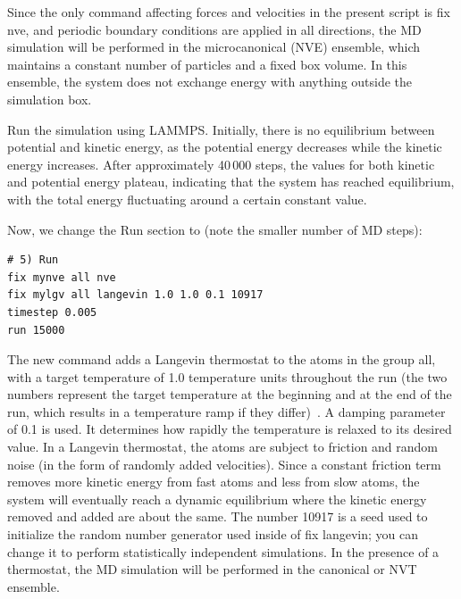 \documentclass[9pt,tutorial]{livecoms}
\newcommand{\lmpcmd}[1]{\hspace{0pt}\colorbox{listing}{\textcolor{command}{\small{#1}}}\hspace{0pt}} %
\begin{document}
\begin{note}
  {\color{blue}Since the only command affecting forces and velocities in the
  present script is \lmpcmd{fix nve}, and periodic boundary conditions are applied
  in all directions,} the MD simulation will be performed in the microcanonical (NVE) ensemble, which
  maintains a constant number of particles and a fixed box volume. In
  this ensemble, the system does not exchange energy with anything
  outside the simulation box.
\end{note}

Run the simulation using LAMMPS.  Initially, there is no equilibrium
between potential and kinetic energy, as the potential energy
decreases while the kinetic energy increases.  After approximately
40\,000 steps, the values for both kinetic and potential energy
plateau, indicating that the system has reached equilibrium, with
the total energy fluctuating around a certain constant value.

Now, we change the \lmpcmd{Run} section to (note the smaller number of
MD steps):
\begin{lstlisting}
# 5) Run
fix mynve all nve
fix mylgv all langevin 1.0 1.0 0.1 10917
timestep 0.005
run 15000
\end{lstlisting}
The new command adds a Langevin thermostat to the atoms in the group
\lmpcmd{all}, with a target temperature of 1.0 temperature units
throughout the run (the two numbers represent the target temperature at
the beginning and at the end of the run, which results in a temperature
ramp if they differ)~\cite{schneider1978molecular}.  A \lmpcmd{damping}
parameter of 0.1 is used.  It determines how rapidly the temperature is
relaxed to its desired value.  In a Langevin thermostat, the atoms are
subject to friction and random noise (in the form of randomly added
velocities).  Since a constant friction term removes more kinetic energy
from fast atoms and less from slow atoms, the system will eventually
reach a dynamic equilibrium where the kinetic energy removed and added
are about the same.  The number 10917 is a seed used to initialize the
random number generator used inside of \lmpcmd{fix langevin}; you can
change it to perform statistically independent simulations.  In the
presence of a thermostat, the MD simulation will be performed in the
canonical or NVT ensemble.
\end{document}
